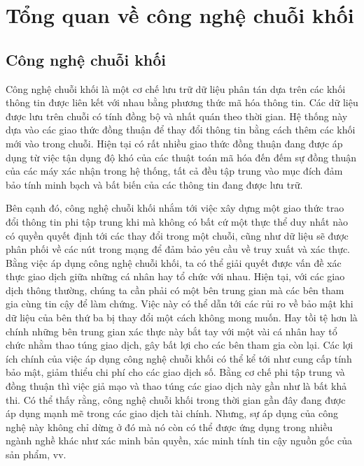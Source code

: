 \section{Tổng quan về công nghệ chuỗi khối}

\subsection{Công nghệ chuỗi khối}

\hspace{1cm}Công nghệ chuỗi khối là một cơ chế lưu trữ dữ liệu phân tán dựa
trên các khối thông tin được liên kết với nhau bằng phương thức mã hóa thông
tin. Các dữ liệu được lưu trên chuỗi có tính đồng bộ và nhất quán theo thời
gian. Hệ thống này dựa vào các giao thức đồng thuận để thay đổi thông tin bằng
cách thêm các khối mới vào trong chuỗi. Hiện tại có rất nhiều giao thức đồng
thuận đang được áp dụng từ việc tận dụng độ khó của các thuật toán mã hóa đến
đếm sự đồng thuận của các máy xác nhận trong hệ thống, tất cả đều tập trung vào
mục đích đảm bảo tính minh bạch và bất biến của các thông tin đang được lưu
trữ.

Bên cạnh đó, công nghệ chuỗi khối nhắm tới việc xây dựng một giao thức trao đổi
thông tin phi tập trung khi mà không có bất cứ một thực thể duy nhất nào có
quyền quyết định tới các thay đổi trong một chuỗi, cũng như dữ liệu sẽ được
phân phối về các nút trong mạng để đảm bảo yêu cầu về truy xuất và xác thực.
Bằng việc áp dụng công nghệ chuỗi khối, ta có thể giải quyết được vấn đề xác
thực giao dịch giữa những cá nhân hay tổ chức với nhau. Hiện tại, với các giao
dịch thông thường, chúng ta cần phải có một bên trung gian mà các bên tham gia
cùng tin cậy để làm chứng. Việc này có thể dẫn tới các rủi ro về bảo mật khi dữ
liệu của bên thứ ba bị thay đổi một cách không mong muốn. Hay tồi tệ hơn là
chính những bên trung gian xác thực này bắt tay với một vài cá nhân hay tổ chức
nhằm thao túng giao dịch, gây bất lợi cho các bên tham gia còn lại. Các lợi ích
chính của việc áp dụng công nghệ chuỗi khối có thể kể tới như cung cấp tính bảo
mật, giảm thiểu chi phí cho các giao dịch số. Bằng cơ chế phi tập trung và đồng
thuận thì việc giả mạo và thao túng các giao dịch này gần như là bất khả thi.
Có thể thấy rằng, công nghệ chuỗi khối trong thời gian gần đây đang được áp
dụng mạnh mẽ trong các giao dịch tài chính. Nhưng, sự áp dụng của công nghệ này
không chỉ dừng ở đó mà nó còn có thể được ứng dụng trong nhiều ngành nghề khác
như xác minh bản quyền, xác minh tính tin cậy nguồn gốc của sản phẩm, vv.

